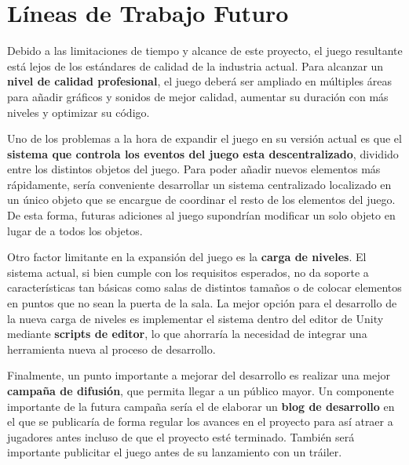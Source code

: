 \section{Líneas de Trabajo Futuro}
Debido a las limitaciones de tiempo y alcance de este proyecto, el juego resultante está lejos de los estándares de calidad de la industria actual. Para alcanzar un \textbf{nivel de calidad profesional}, el juego deberá ser ampliado en múltiples áreas para añadir gráficos y sonidos de mejor calidad, aumentar su duración con más niveles y optimizar su código. 

Uno de los problemas a la hora de expandir el juego en su versión actual es que el \textbf{sistema que controla los eventos del juego esta descentralizado}, dividido entre los distintos objetos del juego. Para poder añadir nuevos elementos más rápidamente, sería conveniente desarrollar un sistema centralizado localizado en un único objeto que se encargue de coordinar el resto de los elementos del juego. De esta forma, futuras adiciones al juego supondrían modificar un solo objeto en lugar de a todos los objetos.

Otro factor limitante en la expansión del juego es la \textbf{carga de niveles}. El sistema actual, si bien cumple con los requisitos esperados, no da soporte a características tan básicas como salas de distintos tamaños o de colocar elementos en puntos que no sean la puerta de la sala. La mejor opción para el desarrollo de la nueva carga de niveles es implementar el sistema dentro del editor de Unity mediante \textbf{scripts de editor}, lo que ahorraría la necesidad de integrar una herramienta nueva al proceso de desarrollo.

Finalmente, un punto importante a mejorar del desarrollo es realizar una mejor \textbf{campaña de difusión}, que permita llegar a un público mayor. Un componente importante de la futura campaña sería el de elaborar un \textbf{blog de desarrollo} en el que se publicaría de forma regular los avances en el proyecto para así atraer a jugadores antes incluso de que el proyecto esté terminado. También será importante publicitar el juego antes de su lanzamiento con un tráiler.
